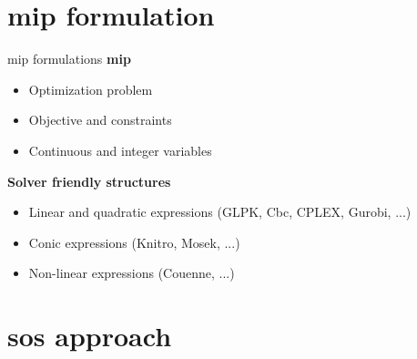 \documentclass[10pt]{beamer}
\begin{document}

\section{\gls{mip} formulation}

\begin{frame}{\gls{mip} formulations}
  \textbf{\gls{mip}}
  \begin{itemize}
    \item Optimization problem
    \item Objective and constraints
    \item Continuous and integer variables
  \end{itemize}
  \pause
  \textbf{Solver friendly structures}
  \begin{itemize}
    \item Linear and quadratic expressions (GLPK, Cbc, CPLEX, Gurobi, ...)
    \item Conic expressions (Knitro, Mosek, ...)
    \item Non-linear expressions (Couenne, ...)
  \end{itemize}
  \pause
  \begin{center}
  \end{center}
\end{frame}

\section{\gls{sos} approach}
\end{document}
